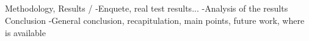 \subsection*{}
{ Methodology, Results } / 
-Enquete, real test results...
-Analysis of the results
Conclusion
-General conclusion, recapitulation, main points, future work, where is available